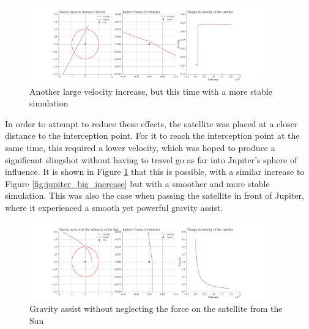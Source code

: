 \documentclass[12pt, english]{report}
\begin{document}
{\begin{figure}[ht]
    \centering
    \includegraphics[width=0.9\textwidth]{graphics/jupiter_reduced_vel.png}
    \caption{Another large velocity increase, but this time with a more stable simulation}
    \label{fig:jupiter_reduced_vel}
\end{figure}

In order to attempt to reduce these effects, the satellite was placed at a closer distance to the interception point. For it to reach the interception point at the same time, this required a lower velocity, which was hoped to produce a significant slingshot without having to travel go as far into Jupiter's sphere of influence. It is shown in Figure \ref{fig:jupiter_reduced_vel} that this is possible, with a similar increase to Figure \ref{fig:jupiter_big_increase} but with a smoother and more stable simulation. This was also the case when passing the satellite in front of Jupiter, where it experienced a smooth yet powerful gravity assist.

\begin{figure}[ht]
    \centering
    \includegraphics[width=0.9\textwidth]{graphics/circularmotion.png}
    \caption{Gravity assist without neglecting the force on the satellite from the Sun}
    \label{fig:circularmotion}
\end{figure}

}
\end{document}

